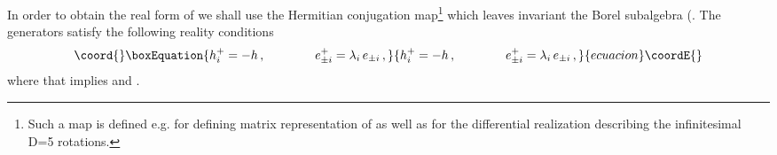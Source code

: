\documentclass[a4paper,12pt,showkeys]{article}
\begin{document}
In order to obtain the real form \coordHE{} of \coordHE{} we shall use
the Hermitian conjugation map\footnote{Such a map is defined e.g.
for defining matrix representation of
 \coordHE{} as well as for the differential realization describing
 the infinitesimal D=5 rotations.}  which leaves invariant the Borel
subalgebra \coordHE{}  (\coordHE{}.
 The \coordHE{} generators satisfy the following reality conditions
\begin{equation}\coord{}\boxEquation{\label{llm2.5}
  h^+_i = - h \, , \qquad \qquad e^+_{\pm i} = \lambda_i \, e_{\pm
  i} \, ,
}{h^+_i = - h \, , \qquad \qquad e^+_{\pm i} = \lambda_i \, e_{\pm
  i} \, ,
}{ecuacion}\coordE{}\end{equation}
where \coordHE{}
  \cite{ll3,ll1}
  that implies \coordHE{} and \coordHE{}.
\end{document}

